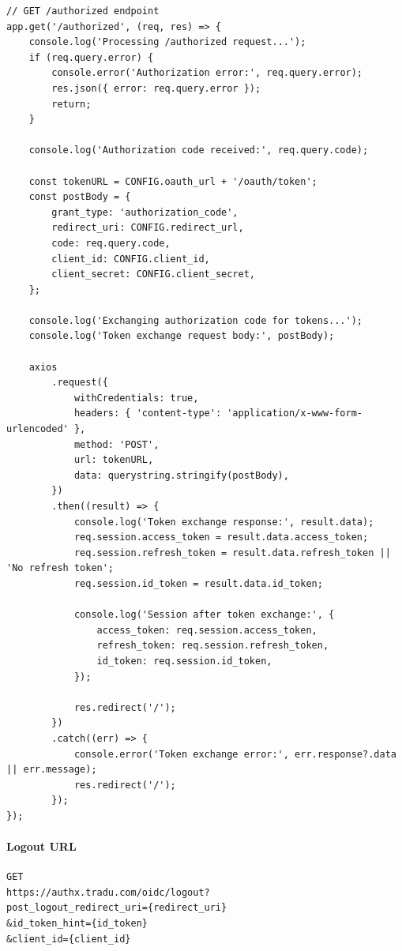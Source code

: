 \documentclass[11pt]{article}
\begin{document}
\begin{codebox}
\begin{verbatim}
// GET /authorized endpoint
app.get('/authorized', (req, res) => {
    console.log('Processing /authorized request...');
    if (req.query.error) {
        console.error('Authorization error:', req.query.error);
        res.json({ error: req.query.error });
        return;
    }

    console.log('Authorization code received:', req.query.code);

    const tokenURL = CONFIG.oauth_url + '/oauth/token';
    const postBody = {
        grant_type: 'authorization_code',
        redirect_uri: CONFIG.redirect_url,
        code: req.query.code,
        client_id: CONFIG.client_id,
        client_secret: CONFIG.client_secret,
    };

    console.log('Exchanging authorization code for tokens...');
    console.log('Token exchange request body:', postBody);

    axios
        .request({
            withCredentials: true,
            headers: { 'content-type': 'application/x-www-form-urlencoded' },
            method: 'POST',
            url: tokenURL,
            data: querystring.stringify(postBody),
        })
        .then((result) => {
            console.log('Token exchange response:', result.data);
            req.session.access_token = result.data.access_token;
            req.session.refresh_token = result.data.refresh_token || 'No refresh token';
            req.session.id_token = result.data.id_token;

            console.log('Session after token exchange:', {
                access_token: req.session.access_token,
                refresh_token: req.session.refresh_token,
                id_token: req.session.id_token,
            });

            res.redirect('/');
        })
        .catch((err) => {
            console.error('Token exchange error:', err.response?.data || err.message);
            res.redirect('/');
        });
});
\end{verbatim}
\end{codebox}

\paragraph{Logout URL}

\begin{verbatim}
GET
https://authx.tradu.com/oidc/logout?
post_logout_redirect_uri={redirect_uri}
&id_token_hint={id_token}
&client_id={client_id}
\end{verbatim}
\end{document}
